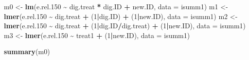 \documentclass[
]{article}
\newenvironment{Shaded}{\begin{snugshade}}{\end{snugshade}}
\newcommand{\AttributeTok}[1]{\textcolor[rgb]{0.13,0.29,0.53}{#1}}
\newcommand{\DecValTok}[1]{\textcolor[rgb]{0.00,0.00,0.81}{#1}}
\newcommand{\FloatTok}[1]{\textcolor[rgb]{0.00,0.00,0.81}{#1}}
\newcommand{\FunctionTok}[1]{\textcolor[rgb]{0.13,0.29,0.53}{\textbf{#1}}}
\newcommand{\NormalTok}[1]{#1}
\newcommand{\OtherTok}[1]{\textcolor[rgb]{0.56,0.35,0.01}{#1}}
\newcommand{\SpecialCharTok}[1]{\textcolor[rgb]{0.81,0.36,0.00}{\textbf{#1}}}
\begin{document}
\begin{Shaded}
\begin{Highlighting}[]
\NormalTok{m0 }\OtherTok{\textless{}{-}} \FunctionTok{lm}\NormalTok{(e.rel}\FloatTok{.150} \SpecialCharTok{\textasciitilde{}}\NormalTok{ dig.treat }\SpecialCharTok{*}\NormalTok{ dig.ID }\SpecialCharTok{+}\NormalTok{ new.ID, }\AttributeTok{data =}\NormalTok{ isumm1)}
\NormalTok{m1 }\OtherTok{\textless{}{-}} \FunctionTok{lmer}\NormalTok{(e.rel}\FloatTok{.150} \SpecialCharTok{\textasciitilde{}}\NormalTok{ dig.treat }\SpecialCharTok{+}\NormalTok{ (}\DecValTok{1}\SpecialCharTok{|}\NormalTok{dig.ID) }\SpecialCharTok{+}\NormalTok{ (}\DecValTok{1}\SpecialCharTok{|}\NormalTok{new.ID), }\AttributeTok{data =}\NormalTok{ isumm1)}
\NormalTok{m2 }\OtherTok{\textless{}{-}} \FunctionTok{lmer}\NormalTok{(e.rel}\FloatTok{.150} \SpecialCharTok{\textasciitilde{}}\NormalTok{ dig.treat }\SpecialCharTok{+}\NormalTok{ (}\DecValTok{1}\SpecialCharTok{|}\NormalTok{dig.ID}\SpecialCharTok{/}\NormalTok{dig.treat) }\SpecialCharTok{+}\NormalTok{ (}\DecValTok{1}\SpecialCharTok{|}\NormalTok{new.ID), }\AttributeTok{data =}\NormalTok{ isumm1)}
\NormalTok{m3 }\OtherTok{\textless{}{-}} \FunctionTok{lmer}\NormalTok{(e.rel}\FloatTok{.150} \SpecialCharTok{\textasciitilde{}}\NormalTok{ treat1 }\SpecialCharTok{+}\NormalTok{ (}\DecValTok{1}\SpecialCharTok{|}\NormalTok{new.ID), }\AttributeTok{data =}\NormalTok{ isumm1)}
\end{Highlighting}
\end{Shaded}

\begin{Shaded}
\begin{Highlighting}[]
\FunctionTok{summary}\NormalTok{(m0)}
\end{Highlighting}
\end{Shaded}
\end{document}

